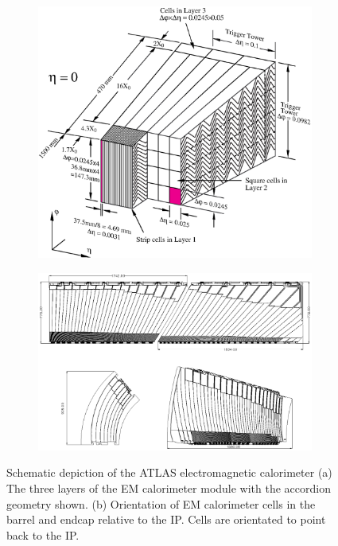 \begin{figure}[h!]
\begin{center}
    \begin{subfigure}[b]{0.40\textwidth}   
        \includegraphics[width=\textwidth, angle=0]{figures/LHC_ATLAS/LARG3-TDR-barrelM.eps}
        \caption{}
    \end{subfigure}
    \begin{subfigure}[b]{0.50\textwidth}
	\includegraphics[width=\textwidth, angle=0]{figures/LHC_ATLAS/LARG3-abcdM.eps}
	\caption{}
    \end{subfigure}
\caption[~Schematic depiction of the ATLAS electromagnetic calorimeter module and cells]{ Schematic depiction of the ATLAS electromagnetic calorimeter (a) The three layers of the EM calorimeter module with the accordion geometry shown. (b) Orientation of EM calorimeter cells in the barrel and endcap relative to the IP.  Cells are orientated to point back to the IP.\cite{ATLAS_JINST} \label{LHC:fig:EMCalo}}
\end{center}
\end{figure}

